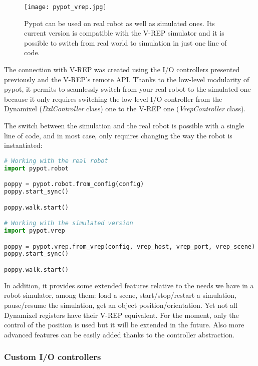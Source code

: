 \begin{figure}[tb]
    \begin{center}
        \texttt{[image: pypot\_vrep.jpg]}
    \end{center}
    \caption{Pypot can be used on real robot as well as simulated ones. Its current version is compatible with the V-REP simulator and it is possible to switch from real world to simulation in just one line of code.}
    \label{fig:pypot-vrep}
\end{figure}


The connection with V-REP was created using the I/O controllers presented previously and the V-REP’s remote API.
Thanks to the low-level modularity of pypot, it permits to seamlessly switch from your real robot to the simulated one because it only requires switching the low-level I/O controller from the Dynamixel (\emph{DxlController} class) one to the V-REP one (\emph{VrepController} class).

The switch between the simulation and the real robot is possible with a single line of code, and in most case, only requires changing the way the robot is instantiated:

\begin{lstlisting}[language = Python]
# Working with the real robot
import pypot.robot

poppy = pypot.robot.from_config(config)
poppy.start_sync()

poppy.walk.start()

# Working with the simulated version
import pypot.vrep

poppy = pypot.vrep.from_vrep(config, vrep_host, vrep_port, vrep_scene)
poppy.start_sync()

poppy.walk.start()
\end{lstlisting}

% 

In addition, it provides some extended features relative to the needs we have in a robot simulator, among them:
load a scene, start/stop/restart a simulation, pause/resume the simulation, get an object position/orientation.
Yet not all Dynamixel registers have their V-REP equivalent. For the moment, only the control of the position is used but it will be extended in the future. Also more advanced features can be easily added thanks to the controller abstraction.


\subsubsection{Custom I/O controllers} %

